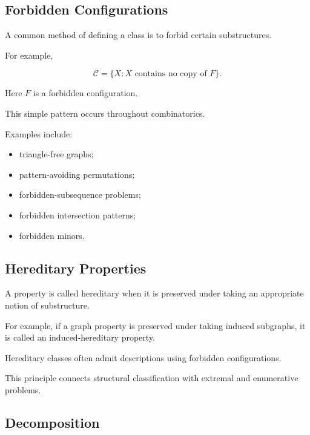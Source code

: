 \subsection{Forbidden Configurations}
\label{subsec:forbidden-configurations}

A common method of defining a class is to forbid certain substructures.

For example,

\[
\boxed{
\mathcal{C}
=
\{X:X\text{ contains no copy of }F\}.
}
\]

Here \(F\) is a forbidden configuration.

This simple pattern occurs throughout combinatorics.

Examples include:

\begin{itemize}
    \item triangle-free graphs;
    \item pattern-avoiding permutations;
    \item forbidden-subsequence problems;
    \item forbidden intersection patterns;
    \item forbidden minors.
\end{itemize}

\subsection{Hereditary Properties}
\label{subsec:hereditary-properties}

A property is called hereditary when it is preserved under taking an
appropriate notion of substructure.

For example, if a graph property is preserved under taking induced
subgraphs, it is called an induced-hereditary property.

Hereditary classes often admit descriptions using forbidden
configurations.

This principle connects structural classification with extremal and
enumerative problems.

\subsection{Decomposition}
\label{subsec:discrete-decomposition}


